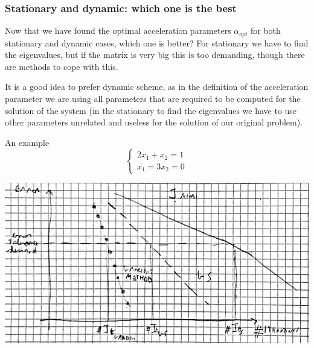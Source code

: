     \subsubsection{Stationary and dynamic: which one is the best}
    Now that we have found the optimal acceleration parameters $\alpha_{opt}$ for both stationary and dynamic cases, which one is better? For stationary we have to find the eigenvalues, but if the matrix is very big this is too demanding, though there are methods to cope with this.

    It is a good idea to prefer dynamic scheme, as in the definition of the acceleration parameter we are using all parameters that are required to be computed for the solution of the system (in the stationary to find the eigenvalues we have to use other parameters unrelated and useless for the solution of our original problem).

    An example
    $$
    \begin{cases}
        2x_1+x_2=1\\
        x_1=3x_2=0
    \end{cases}
    $$
    \begin{center}
        \includegraphics[width=1\textwidth]{images/20221118-2.png}
    \end{center}

